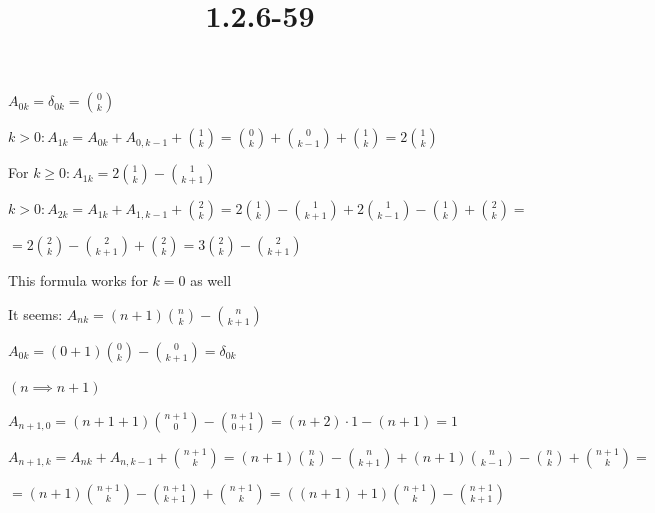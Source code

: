 \documentclass{article}
\title{1.2.6-59}
\begin{document}
\maketitle

$A_{0k} = \delta_{0k} = \binom{0}{k}$

$k > 0: A_{1k} = A_{0k} + A_{0,k-1} + \binom{1}{k} = \binom{0}{k} + \binom{0}{k - 1} + \binom{1}{k} = 2 \binom{1}{k}$

For $k \geq 0: A_{1k} = 2\binom{1}{k} - \binom{1}{k + 1}$

$k > 0: A_{2k} = A_{1k} + A_{1,k-1} + \binom{2}{k} = 2\binom{1}{k} - \binom{1}{k+1} + 2\binom{1}{k-1} - \binom{1}{k} + \binom{2}{k} =$

$= 2\binom{2}{k} - \binom{2}{k+1} + \binom{2}{k} = 3 \binom{2}{k} - \binom{2}{k+1}$

This formula works for $k = 0$ as well

It seems: $A_{nk} = (n+1) \binom{n}{k} - \binom{n}{k+1}$

$A_{0k} = (0+1)\binom{0}{k} - \binom{0}{k+1} = \delta_{0k}$

$(n \implies n + 1)$

$A_{n+1,0} = (n+1+1)\binom{n+1}{0} - \binom{n+1}{0+1} = (n+2)\cdot 1 - (n + 1) = 1$

$A_{n+1,k} = A_{nk} + A_{n,k-1} + \binom{n+1}{k} = (n+1) \binom{n}{k} - \binom{n}{k+1} + (n+1) \binom{n}{k - 1} - \binom{n}{k} + \binom{n+1}{k} =$

$= (n+1)\binom{n+1}{k} - \binom{n+1}{k+1} + \binom{n+1}{k} = ((n+1)+1)\binom{n+1}{k} - \binom{n+1}{k+1}$
\end{document}

